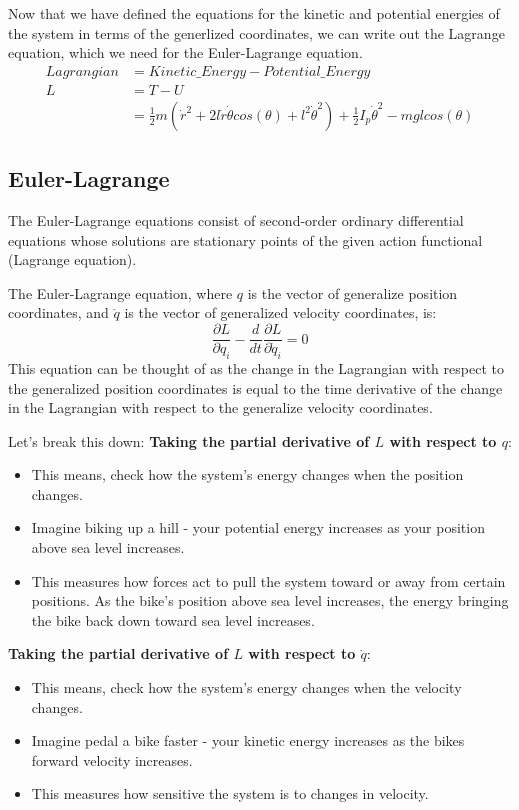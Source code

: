 Now that we have defined the equations for the kinetic and potential energies of the system in terms of the generlized coordinates, we can write out the Lagrange equation, which we need for the Euler-Lagrange equation.
\begin{align}
	Lagrangian &= Kinetic\_Energy - Potential\_Energy \\
	L &= T - U \\
	   &= \frac{1}{2}m(\dot{r}^2 + 2l\dot{r}\dot{\theta}cos(\theta) + l^2\dot{\theta}^2) + \frac{1}{2}I_p\dot{\theta}^2 - mglcos(\theta)
\end{align}

\subsection{Euler-Lagrange}
The Euler-Lagrange equations consist of second-order ordinary differential equations whose solutions are stationary points of the given action functional (Lagrange equation).

The Euler-Lagrange equation, where $q$ is the vector of generalize position coordinates, and $\dot{q}$ is the vector of generalized velocity coordinates, is:
\begin{equation}
	\frac{\partial L}{\partial q_i} - \frac{d}{dt} \frac{\partial L}{\partial \dot q_i} = 0
\end{equation}
This equation can be thought of as the change in the Lagrangian with respect to the generalized position coordinates is equal to the time derivative of the change in the Lagrangian with respect to the generalize velocity coordinates.

Let's break this down:
\textbf{Taking the partial derivative of $L$ with respect to $q$}:
	\begin{itemize}
		\item This means, check how the system's energy changes when the position changes.
		\item Imagine biking up a hill - your potential energy increases as your position above sea level increases.
		\item This measures how forces act to pull the system toward or away from certain positions. As the bike's position above sea level increases, the energy bringing the bike back down toward sea level increases.
	\end{itemize}
	
\textbf{Taking the partial derivative of $L$ with respect to $\dot{q}$}:
	\begin{itemize}
		\item This means, check how the system's energy changes when the velocity changes.
		\item Imagine pedal a bike faster - your kinetic energy increases as the bikes forward velocity increases.
		\item This measures how sensitive the system is to changes in velocity.
	\end{itemize}
	
